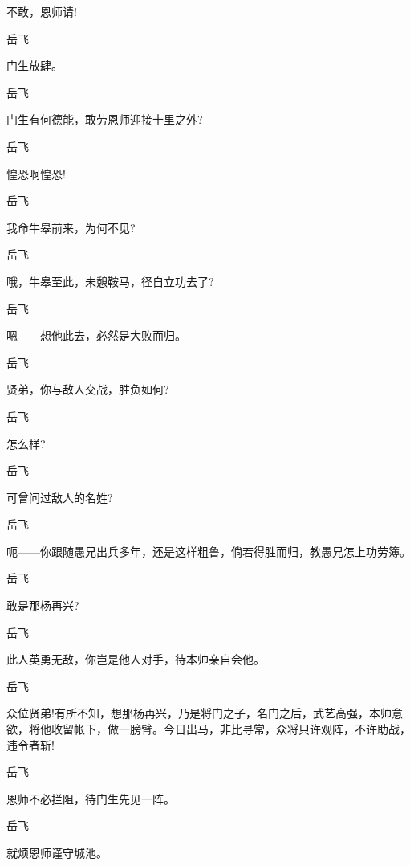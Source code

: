 {{{{不敢，恩师请!}

{岳飞\hspace{30pt}~

门生放肆。}

{岳飞\hspace{30pt}~

门生有何德能，敢劳恩师迎接十里之外?}

{岳飞\hspace{30pt}~

惶恐啊惶恐!}

{岳飞\hspace{30pt}~

我命牛皋前来，为何不见?}

{岳飞\hspace{30pt}~

哦，牛皋至此，未憩鞍马，径自立功去了?}

{岳飞\hspace{30pt}~

嗯------想他此去，必然是大败而归。}

{岳飞\hspace{30pt}~

贤弟，你与敌人交战，胜负如何?}

{岳飞\hspace{30pt}~

怎么样?}

{岳飞\hspace{30pt}~

可曾问过敌人的名姓?}

{岳飞

呃------你跟随愚兄出兵多年，还是这样粗鲁，倘若得胜而归，教愚兄怎上功劳簿。}

{岳飞\hspace{30pt}~

敢是那杨再兴?}

{岳飞\hspace{30pt}~

此人英勇无敌，你岂是他人对手，待本帅亲自会他。}

{岳飞

众位贤弟!有所不知，想那杨再兴，乃是将门之子，名门之后，武艺高强，本帅意欲，将他收留帐下，做一膀臂。今日出马，非比寻常，众将只许观阵，不许助战，违令者斩!}

{岳飞\hspace{30pt}~

恩师不必拦阻，待门生先见一阵。}

{岳飞\hspace{30pt}~

就烦恩师谨守城池。}

}}}

